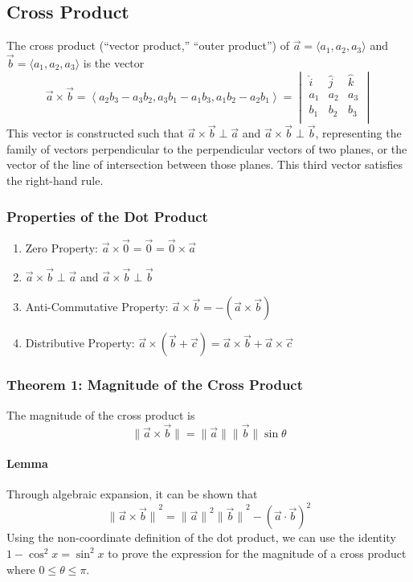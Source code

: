\documentclass{article}
\newcommand{\vect}[1]{\ensuremath{\overrightarrow{#1}}}
\newcommand{\magnitude}[1]{\ensuremath{\lVert #1 \rVert}}
\newcommand{\magvect}[1]{\magnitude{\vect{#1}}}
\begin{document}
\subsection{Cross Product}
The cross product (``vector product,'' ``outer product'') of $\vect{a} = \langle a_1, a_2, a_3 \rangle$ and $\vect{b} = \langle a_1, a_2, a_3 \rangle$ is the vector
$$\vect{a} \times \vect{b} = \left\langle a_2b_3 - a_3b_2, a_3b_1 - a_1b_3, a_1b_2 - a_2b_1\right\rangle =
    \begin{vmatrix}
        \hat{i} & \hat{j} & \hat{k} \\
        a_1     & a_2     & a_3     \\
        b_1     & b_2     & b_3     \\
    \end{vmatrix}
$$
This vector is constructed such that $\vect{a} \times \vect{b} \perp \vect{a}$ and $\vect{a} \times \vect{b} \perp \vect{b}$, representing the family of vectors perpendicular to the perpendicular vectors of two planes, or the vector of the line of intersection between those planes. This third vector satisfies the right-hand rule.

\subsubsection{Properties of the Dot Product}
\begin{enumerate}
    \item Zero Property: $\vect{a} \times \vect{0} = \vect{0} = \vect{0} \times \vect{a}$
    \item $\vect{a} \times \vect{b} \perp \vect{a}$ and $\vect{a} \times \vect{b} \perp \vect{b}$
    \item Anti-Commutative Property: $\vect{a} \times \vect{b} = -\left(\vect{a} \times \vect{b}\right)$
    \item Distributive Property: $\vect{a} \times \left(\vect{b} + \vect{c}\right) = \vect{a} \times \vect{b} + \vect{a} \times \vect{c}$
\end{enumerate}
\subsubsection{Theorem 1: Magnitude of the Cross Product}\label{mag-cross-product}
The magnitude of the cross product is
$$\magnitude{\vect{a} \times \vect{b}} = \magvect{a}\magvect{b}\sin{\theta}$$

\paragraph{Lemma} Through algebraic expansion, it can be shown that $$\magnitude{\vect{a} \times \vect{b}}^2 = \magvect{a}^2\magvect{b}^2 - \left(\vect{a} \cdot \vect{b}\right)^2$$
Using the non-coordinate definition of the dot product, we can use the identity $1-\cos^2{x} = \sin^2{x}$ to prove the expression for the magnitude of a cross product where $0 \le \theta \le \pi$.
\end{document}
